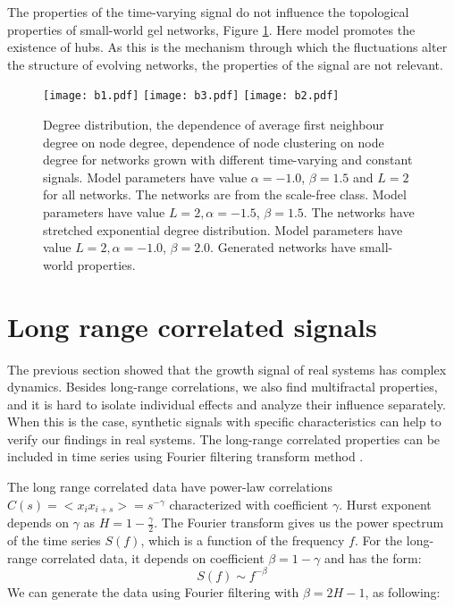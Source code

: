 The properties of the time-varying signal do not influence the topological properties of small-world gel networks, Figure \ref{fig:properties_net}. Here model promotes the existence of hubs. As this is the mechanism through which the fluctuations alter the structure of evolving networks, the properties of the signal are not relevant.   

\begin{figure}[H]
	\centering
	\texttt{[image: b1.pdf]}
	\texttt{[image: b3.pdf]}
	\texttt{[image: b2.pdf]}
	\caption[Structural properties of networks.]{Degree distribution, the dependence of average first neighbour degree on node degree, dependence of node clustering on node degree for networks grown with different time-varying and constant signals. Model parameters have value $\alpha=-1.0$, $\beta=1.5$  and $L=2$ for all networks. The networks are from the scale-free class. Model parameters have value $L=2, \alpha=-1.5$, $\beta=1.5$. The networks have stretched exponential degree distribution. Model parameters have value $ L=2, \alpha=-1.0$, $\beta=2.0$. Generated networks have small-world properties.}
	\label{fig:properties_net}
\end{figure}

\section{Long range correlated signals}

The previous section showed that the growth signal of real systems has complex dynamics. Besides long-range correlations, we also find multifractal properties, and it is hard to isolate individual effects and analyze their influence separately. When this is the case, synthetic signals with specific characteristics can help to verify our findings in real systems. The long-range correlated properties can be included in time series using Fourier filtering transform method \cite{makse1996method}. 

The long range correlated data have power-law correlations $C(s)= <x_i x_{i+s}> = s ^ {-\gamma}$ characterized with coefficient $\gamma$. Hurst exponent depends on $\gamma$ as  $H = 1- \frac{\gamma}{2}$. The Fourier transform gives us the power spectrum of the time series $S(f)$, which is a function of the frequency $f$. For the long-range correlated data, it depends on coefficient $\beta = 1-\gamma$ and has the form:
\begin{equation}
S(f) \sim f^{-\beta}
\end{equation}
We can generate the data using Fourier filtering with $\beta = 2H - 1$, as following:

